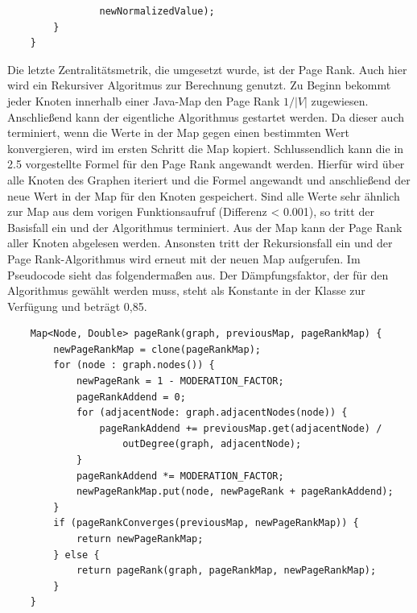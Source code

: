 \documentclass[a4paper,12pt,ngerman,chapterprefix=false,listof=totoc,bibliography=totoc]{scrreprt}
\begin{document}
{{{\begin{lstlisting}
				newNormalizedValue);
		}
	}
\end{lstlisting}
Die letzte Zentralitätsmetrik, die umgesetzt wurde, ist der Page Rank. Auch hier wird ein Rekursiver Algoritmus zur Berechnung genutzt. Zu Beginn bekommt jeder Knoten innerhalb einer Java-Map den Page Rank \(1/|V|\) zugewiesen. Anschließend kann der eigentliche Algorithmus gestartet werden. Da dieser auch terminiert, wenn die Werte in der Map gegen einen bestimmten Wert konvergieren, wird im ersten Schritt die Map kopiert. Schlussendlich kann die in 2.5 vorgestellte Formel für den Page Rank angewandt werden. Hierfür wird über alle Knoten des Graphen iteriert und die Formel angewandt und anschließend der neue Wert in der Map für den Knoten gespeichert. Sind alle Werte sehr ähnlich zur Map aus dem vorigen Funktionsaufruf (Differenz < 0.001), so tritt der Basisfall ein und der Algorithmus terminiert. Aus der Map kann der Page Rank aller Knoten abgelesen werden. Ansonsten tritt der Rekursionsfall ein und der Page Rank-Algorithmus wird erneut mit der neuen Map aufgerufen. Im Pseudocode sieht das folgendermaßen aus. Der Dämpfungsfaktor, der für den Algorithmus gewählt werden muss, steht als Konstante in der Klasse zur Verfügung und beträgt 0,85.
\begin{lstlisting}
	Map<Node, Double> pageRank(graph, previousMap, pageRankMap) {
		newPageRankMap = clone(pageRankMap);
		for (node : graph.nodes()) {
			newPageRank = 1 - MODERATION_FACTOR;
			pageRankAddend = 0;
			for (adjacentNode: graph.adjacentNodes(node)) {
				pageRankAddend += previousMap.get(adjacentNode) /
					outDegree(graph, adjacentNode);
			}
			pageRankAddend *= MODERATION_FACTOR;
			newPageRankMap.put(node, newPageRank + pageRankAddend);
		}
		if (pageRankConverges(previousMap, newPageRankMap)) {
			return newPageRankMap;
		} else {
			return pageRank(graph, pageRankMap, newPageRankMap);
		}
	}
\end{lstlisting}
}
}}
\end{document}
